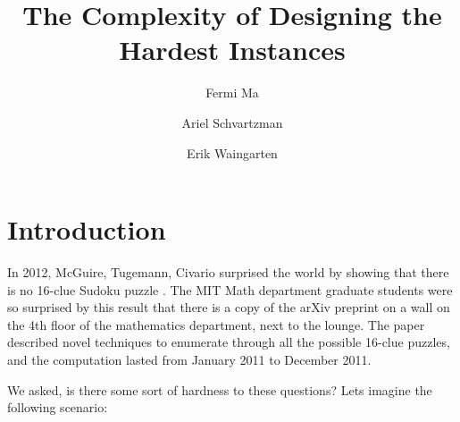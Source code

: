 \documentclass[runningheads,a4paper]{llncs}
\begin{document}
\mainmatter  %

\title{The Complexity of Designing the Hardest Instances}


%
%
\author{Fermi Ma \and Ariel Schvartzman \and Erik Waingarten}
%


%
%

\maketitle

\section{Introduction}
\label{sec:Introduction}

In 2012, McGuire, Tugemann, Civario surprised the world by showing that there is no 16-clue Sudoku puzzle \cite{mcguire2012there}. The MIT Math department graduate students were so surprised by this result that there is a copy of the arXiv preprint on a wall on the 4th floor of the mathematics department, next to the lounge. The paper described novel techniques to enumerate through all the possible 16-clue puzzles, and the computation lasted from January 2011 to December 2011. 

We asked, is there some sort of hardness to these questions? Lets imagine the following scenario:
\end{document}
